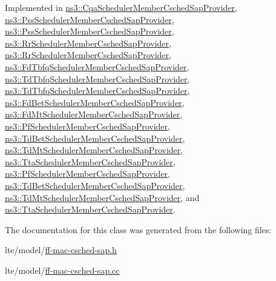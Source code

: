 Implemented in \hyperlink{classns3_1_1CqaSchedulerMemberCschedSapProvider_a60f00655fcd4cf90a0246b06f91d9b7f}{ns3\+::\+Cqa\+Scheduler\+Member\+Csched\+Sap\+Provider}, \hyperlink{classns3_1_1PssSchedulerMemberCschedSapProvider_ae852c78c2ce9f43b5264e39f64f15c38}{ns3\+::\+Pss\+Scheduler\+Member\+Csched\+Sap\+Provider}, \hyperlink{classns3_1_1PssSchedulerMemberCschedSapProvider_aaef57062662f3d89227ab8a249e3a594}{ns3\+::\+Pss\+Scheduler\+Member\+Csched\+Sap\+Provider}, \hyperlink{classns3_1_1RrSchedulerMemberCschedSapProvider_ae242835b225a1c5b3b4370fe1fbbdfcd}{ns3\+::\+Rr\+Scheduler\+Member\+Csched\+Sap\+Provider}, \hyperlink{classns3_1_1RrSchedulerMemberCschedSapProvider_af839bd761a9a718abec03fe6b0207109}{ns3\+::\+Rr\+Scheduler\+Member\+Csched\+Sap\+Provider}, \hyperlink{classns3_1_1FdTbfqSchedulerMemberCschedSapProvider_ae92dc99690227f23004682a871f9514c}{ns3\+::\+Fd\+Tbfq\+Scheduler\+Member\+Csched\+Sap\+Provider}, \hyperlink{classns3_1_1TdTbfqSchedulerMemberCschedSapProvider_a16be3d0c6f3d657495c1131cc93efa8b}{ns3\+::\+Td\+Tbfq\+Scheduler\+Member\+Csched\+Sap\+Provider}, \hyperlink{classns3_1_1TdTbfqSchedulerMemberCschedSapProvider_a5e2ec279b9327a71d451f419d9c5c295}{ns3\+::\+Td\+Tbfq\+Scheduler\+Member\+Csched\+Sap\+Provider}, \hyperlink{classns3_1_1FdBetSchedulerMemberCschedSapProvider_a05516802dbb32e8b8edd625f8dbfba0f}{ns3\+::\+Fd\+Bet\+Scheduler\+Member\+Csched\+Sap\+Provider}, \hyperlink{classns3_1_1FdMtSchedulerMemberCschedSapProvider_a897d92ba037a29821cefe4272ceaec24}{ns3\+::\+Fd\+Mt\+Scheduler\+Member\+Csched\+Sap\+Provider}, \hyperlink{classns3_1_1PfSchedulerMemberCschedSapProvider_a9e1ed9a4867cbc862978cbffa7cb5810}{ns3\+::\+Pf\+Scheduler\+Member\+Csched\+Sap\+Provider}, \hyperlink{classns3_1_1TdBetSchedulerMemberCschedSapProvider_a3e2936a22059eeab7dea7e296b1fa8a7}{ns3\+::\+Td\+Bet\+Scheduler\+Member\+Csched\+Sap\+Provider}, \hyperlink{classns3_1_1TdMtSchedulerMemberCschedSapProvider_a1acd605c886d06fa00ed0a7255536108}{ns3\+::\+Td\+Mt\+Scheduler\+Member\+Csched\+Sap\+Provider}, \hyperlink{classns3_1_1TtaSchedulerMemberCschedSapProvider_a317fc90d9775fd1837d00e81ed1e1431}{ns3\+::\+Tta\+Scheduler\+Member\+Csched\+Sap\+Provider}, \hyperlink{classns3_1_1PfSchedulerMemberCschedSapProvider_a331ead24cb8401270ca03659bc91c830}{ns3\+::\+Pf\+Scheduler\+Member\+Csched\+Sap\+Provider}, \hyperlink{classns3_1_1TdBetSchedulerMemberCschedSapProvider_a112571d55cfea2cab9f4cc0c89280a12}{ns3\+::\+Td\+Bet\+Scheduler\+Member\+Csched\+Sap\+Provider}, \hyperlink{classns3_1_1TdMtSchedulerMemberCschedSapProvider_aec882a4915162718d2aa0ed132a26c27}{ns3\+::\+Td\+Mt\+Scheduler\+Member\+Csched\+Sap\+Provider}, and \hyperlink{classns3_1_1TtaSchedulerMemberCschedSapProvider_aab6396eb0a8e7fe6c4fb47df256124e6}{ns3\+::\+Tta\+Scheduler\+Member\+Csched\+Sap\+Provider}.



The documentation for this class was generated from the following files\+:\begin{DoxyCompactItemize}
\item 
lte/model/\hyperlink{ff-mac-csched-sap_8h}{ff-\/mac-\/csched-\/sap.\+h}\item 
lte/model/\hyperlink{ff-mac-csched-sap_8cc}{ff-\/mac-\/csched-\/sap.\+cc}\end{DoxyCompactItemize}
